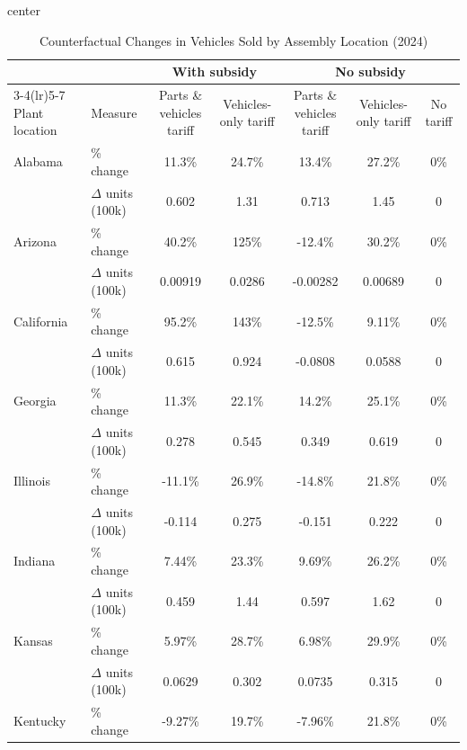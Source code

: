 \begin{table}[!htbp]
\centering
\caption{Counterfactual Changes in Vehicles Sold by Assembly Location (2024)}
\label{tab:plant_location_changes}
\scriptsize
\setlength{\tabcolsep}{3pt}
\renewcommand{\arraystretch}{1.10}

\begin{adjustbox}{center}
\begin{threeparttable}
\begin{tabular}{llccccc}
\toprule
 &  & \multicolumn{2}{c}{With subsidy} & \multicolumn{3}{c}{No subsidy} \\
\cmidrule(lr){3-4}\cmidrule(lr){5-7}
Plant location & Measure
& Parts \& vehicles tariff & Vehicles-only tariff
& Parts \& vehicles tariff & Vehicles-only tariff & No tariff \\
\midrule
Alabama & \% change             & 11.3\% & 24.7\% & 13.4\% & 27.2\% & 0\% \\
        & $\Delta$ units (100k) & 0.602 & 1.31 & 0.713 & 1.45 & 0 \\
\addlinespace[2pt]
Arizona & \% change             & 40.2\% & 125\% & -12.4\% & 30.2\% & 0\% \\
        & $\Delta$ units (100k) & 0.00919 & 0.0286 & -0.00282 & 0.00689 & 0 \\
\addlinespace[2pt]
California & \% change             & 95.2\% & 143\% & -12.5\% & 9.11\% & 0\% \\
        & $\Delta$ units (100k) & 0.615 & 0.924 & -0.0808 & 0.0588 & 0 \\
\addlinespace[2pt]
Georgia & \% change             & 11.3\% & 22.1\% & 14.2\% & 25.1\% & 0\% \\
        & $\Delta$ units (100k) & 0.278 & 0.545 & 0.349 & 0.619 & 0 \\
\addlinespace[2pt]
Illinois & \% change             & -11.1\% & 26.9\% & -14.8\% & 21.8\% & 0\% \\
        & $\Delta$ units (100k) & -0.114 & 0.275 & -0.151 & 0.222 & 0 \\
\addlinespace[2pt]
Indiana & \% change             & 7.44\% & 23.3\% & 9.69\% & 26.2\% & 0\% \\
        & $\Delta$ units (100k) & 0.459 & 1.44 & 0.597 & 1.62 & 0 \\
\addlinespace[2pt]
Kansas & \% change             & 5.97\% & 28.7\% & 6.98\% & 29.9\% & 0\% \\
        & $\Delta$ units (100k) & 0.0629 & 0.302 & 0.0735 & 0.315 & 0 \\
\addlinespace[2pt]
Kentucky & \% change             & -9.27\% & 19.7\% & -7.96\% & 21.8\% & 0\% \\

\end{tabular}
\end{threeparttable}
\end{adjustbox}
\end{table}
